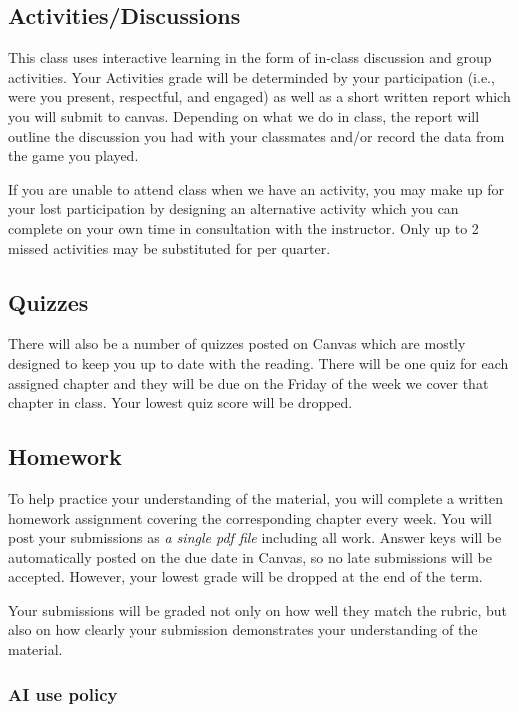 \hypertarget{grade:activity}{\subsection{Activities/Discussions}}

This class uses interactive learning in the form of in-class discussion and group activities.
Your Activities grade will be determinded by your participation (i.e., were you present, respectful, and engaged)
as well as a short written report which you will submit to canvas.
Depending on what we do in class, the report will outline the discussion you had with your classmates
and/or record the data from the game you played.

If you are unable to attend class when we have an activity, you may make up for your lost participation by designing an alternative activity which you can complete on your own time in consultation with the instructor.
Only up to 2 missed activities may be substituted for per quarter.

\hypertarget{grade:quiz}{\subsection{Quizzes}}

There will also be a number of quizzes posted on Canvas which are mostly designed to keep you up to date with the reading.
There will be one quiz for each assigned chapter and they will be due on the Friday of the week we cover that chapter in class.
Your lowest quiz score will be dropped.
 
\hypertarget{grade:HW}{\subsection{Homework}}

To help practice your understanding of the material, you will complete a written homework assignment covering the corresponding chapter every week.
You will post your submissions as \textit{a single pdf file} including all work.
Answer keys will be automatically posted on the due date in Canvas, so no late submissions will be accepted.
However, your lowest grade will be dropped at the end of the term.

Your submissions will be graded not only on how well they match the rubric,
but also on how clearly your submission demonstrates your understanding of the material.

\hypertarget{policy:AI}{\subsubsection{AI use policy}}

